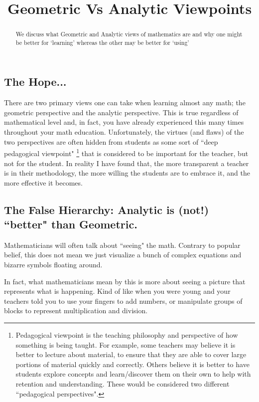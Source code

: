 \documentclass{ximeraXloud}
\title{Geometric Vs Analytic Viewpoints}
\begin{document}
\begin{abstract}
    We discuss what Geometric and Analytic views of mathematics are and why one might be better for `learning' whereas the other may be better for `using'
\end{abstract}
\maketitle

\subsection*{The Hope...}

    There are two primary views one can take when learning almost any math; the geometric perspective and the analytic perspective. This is true regardless of mathematical level and, in fact, you have already experienced this many times throughout your math education. Unfortunately, the virtues (and flaws) of the two perspectives are often hidden from students as some sort of ``deep pedagogical viewpoint"%
    \footnote{%
        Pedagogical viewpoint is the teaching philosophy and perspective of how something is being taught. For example, some teachers may believe it is better to lecture about material, to ensure that they are able to cover large portions of material quickly and correctly. Others believe it is better to have students explore concepts and learn/discover them on their own to help with retention and understanding. These would be considered two different ``pedagogical perspectives".%
        }
    that is considered to be important for the teacher, but not for the student. In reality I have found that, the more transparent a teacher is in their methodology, the more willing the students are to embrace it, and the more effective it becomes.

\subsection*{The False Hierarchy: Analytic is (not!) ``better" than Geometric.}

    Mathematicians will often talk about ``seeing" the math. Contrary to popular belief, this does not mean we just visualize a bunch of complex equations and bizarre symbols floating around.
    
    In fact, what mathematicians mean by this is more about seeing a picture that represents what is happening. Kind of like when you were young and your teachers told you to use your fingers to add numbers, or manipulate groups of blocks to represent multiplication and division.
    
\end{document}
